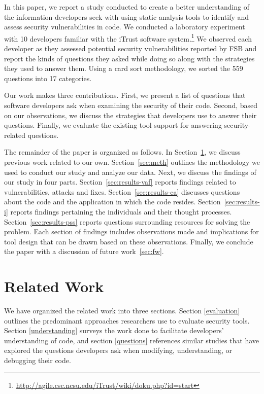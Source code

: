 \documentclass[conference]{IEEEtran}
\begin{document}
In this paper, we report a study conducted to create a better understanding of the information developers seek with using static analysis tools to identify and assess security vulnerabilities in code.
We conducted a laboratory experiment with 10 developers familiar with the iTrust software system.\footnote{\url{http://agile.csc.ncsu.edu/iTrust/wiki/doku.php?id=start}} 
We observed each developer as they assessed potential security vulnerabilities reported by FSB and report the kinds of questions they asked while doing so along with the strategies they used to answer them.
Using a card sort methodology, we sorted the 559 questions into 17 categories. 

Our work makes three contributions. 
First, we present a list of questions that software developers ask when examining the security of their code.
Second, based on our observations, we discuss the strategies that developers use to answer their questions.
Finally, we evaluate the existing tool support for answering security-related questions.

The remainder of the paper is organized as follows. 
In Section~\ref{sec:rw}, we discuss previous work related to our own. 
Section~\ref{sec:meth} outlines the methodology we used to conduct our study and analyze our data. 
Next, we discuss the findings of our study in four parts. 
Section~\ref{sec:results-vaf} reports findings related to vulnerabilities, attacks and fixes. 
Section~\ref{sec:results-ca} discusses questions about the code and the application in which the code resides.
Section~\ref{sec:results-i} reports findings pertaining the individuals and their thought processes.
Section~\ref{sec:results-pss} reports questions surrounding resources for solving the problem.
Each section of findings includes observations made and implications for tool design that can be drawn based on these observations. 
Finally, we conclude the paper with a discussion of future work~\ref{sec:fw}.







\section{Related Work}
\label{sec:rw}

We have organized the related work into three sections. Section \ref{evaluation} outlines the predominant approaches researchers use to evaluate security tools. 
Section \ref{understanding} surveys the work done to facilitate developers' understanding of code, and section \ref{questions} references similar studies that have explored the questions developers ask when modifying, understanding, or debugging their code.
\end{document}
